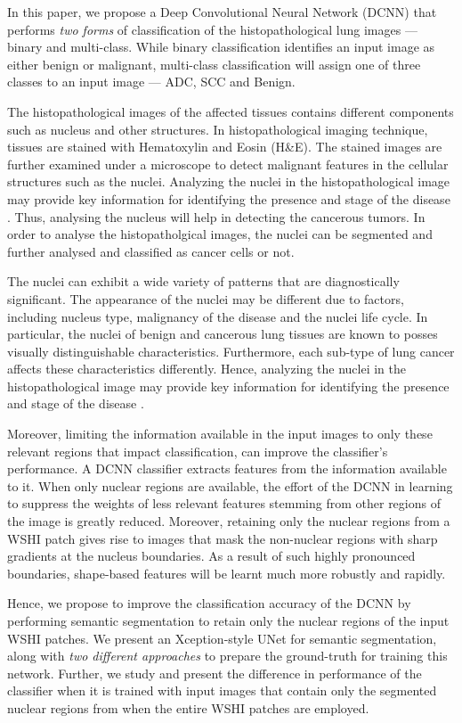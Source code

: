 \documentclass{comjnl}
\begin{document}
In this paper, we propose a Deep Convolutional Neural Network (DCNN) that performs \emph{two forms} of classification of the histopathological lung images --- binary and multi-class. While binary classification identifies an input  image as either benign or malignant, multi-class classification will assign one of three classes to an input image --- ADC, SCC and Benign. 

The histopathological images of the affected tissues contains different components such as nucleus and other structures.  In histopathological imaging technique, tissues are stained with Hematoxylin and Eosin (H&E). The stained images are further examined under a microscope to detect malignant features in the cellular structures such as the nuclei. Analyzing the nuclei in the histopathological image may provide key information for identifying the presence and stage of the disease \cite{confjung}. Thus, analysing the nucleus will help in detecting the cancerous tumors. In order to analyse the histopatholgical images, the nuclei can be segmented and further analysed and classified as cancer cells or not.


The nuclei can exhibit a wide variety of patterns that are diagnostically significant. The appearance of the nuclei may be different due to factors, including nucleus type, malignancy of the disease and the nuclei life cycle. In particular, the nuclei of benign and cancerous lung tissues are known to posses visually distinguishable characteristics. Furthermore, each sub-type of lung cancer affects these characteristics differently. Hence, analyzing the nuclei in the histopathological image may provide key information for identifying the presence and stage of the disease \cite{confjung}.

Moreover, limiting the information available in the input images to only these relevant regions that impact classification, can improve the classifier's performance. A DCNN classifier extracts features from the information available to it. When only nuclear regions are available, the effort of the DCNN in learning to suppress the weights of less relevant features stemming from other regions of the image is greatly reduced. Moreover, retaining only the nuclear regions from a WSHI patch gives rise to images that mask the non-nuclear regions with sharp gradients at the nucleus boundaries. As a result of such highly pronounced boundaries, shape-based features will be learnt much more robustly and rapidly.

Hence, we propose to improve the classification accuracy of the DCNN by performing semantic segmentation to retain only the nuclear regions of the input WSHI patches. We present an Xception-style UNet for semantic segmentation, along with \emph{two different approaches} to prepare the ground-truth for training this network. Further, we study and present the difference in performance of the classifier when it is trained with input images that contain only the segmented nuclear regions from when the entire WSHI patches are employed.  
\end{document}

